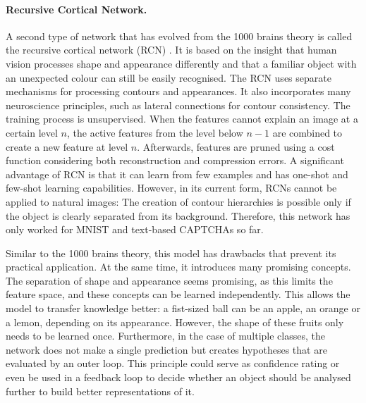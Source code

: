 \paragraph{Recursive Cortical Network.} A second type of network that has evolved from the 1000 brains theory  is called the recursive cortical network (RCN) . It is based on the insight that human vision processes shape and appearance differently and that a familiar object with an unexpected colour can still be easily recognised.
The RCN uses separate mechanisms for processing contours and appearances. It also incorporates many neuroscience principles, such as lateral connections for contour consistency.
The training process is unsupervised. When the features cannot explain an image at a certain level $n$, the active features from the level below $n-1$ are combined to create a new feature at level $n$. Afterwards, features are pruned using a cost function considering both reconstruction and compression errors.
A significant advantage of RCN is that it can learn from few examples and has one-shot and few-shot learning capabilities.
However, in its current form, RCNs cannot be applied to natural images: The creation of contour hierarchies is possible only if the object is clearly separated from its background. Therefore, this network has only worked for MNIST and text-based CAPTCHAs so far.

Similar to the 1000 brains theory, this model has drawbacks that prevent its practical application. At the same time, it introduces many promising concepts. The separation of shape and appearance seems promising, as this limits the feature space, and these concepts can be learned independently. This allows the model to transfer knowledge better: a fist-sized ball can be an apple, an orange or a lemon, depending on its appearance. However, the shape of these fruits only needs to be learned once. Furthermore, in the case of multiple classes, the network does not make a single prediction but creates hypotheses that are evaluated by an outer loop. This principle could serve as confidence rating or even be used in a feedback loop to decide whether an object should be analysed further to build better representations of it.

